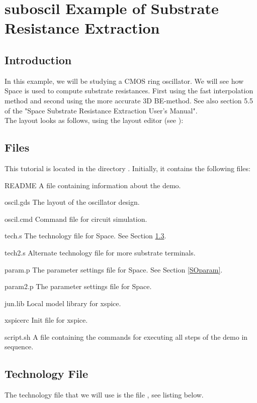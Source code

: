 \chapter{suboscil Example of Substrate Resistance Extraction}
\section{Introduction}
\label{SOintro}
In this example, we will be studying a CMOS ring oscillator.
We will see how Space is used to compute substrate resistances.
First using the fast interpolation method and
second using the more accurate 3D BE-method.
See also section 5.5 of the "Space Substrate Resistance Extraction User's Manual".
\\[1 ex]
The layout looks as follows, using the layout editor  (see ):

\begin{figure}[h]
\centerline{}
\end{figure}

\section{Files}
This tutorial is located in the directory .
Initially, it contains the following files:
\begin{filelist}
\item[README] A file containing information about the demo.
\item[oscil.gds] The layout of the oscillator design.
\item[oscil.cmd] Command file for circuit simulation.
\item[tech.s] The technology file for Space. See Section \ref{SOtech}.
\item[tech2.s] Alternate technology file for more substrate terminals.
\item[param.p] The parameter settings file for Space. See Section \ref{SOparam}.
\item[param2.p] The parameter settings file for Space.
\item[jun.lib] Local model library for xspice.
\item[xspicerc] Init file for xspice.
\item[script.sh] A file containing the commands for executing all
steps of the demo in sequence.
\end{filelist}

\section{Technology File}
\label{SOtech}
The technology file that we will use is the file , see listing below.

